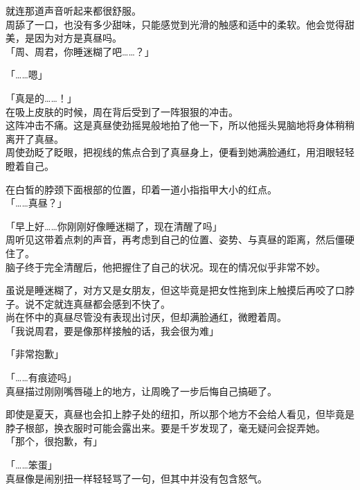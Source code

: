 就连那道声音听起来都很舒服。\\

周舔了一口，也没有多少甜味，只能感觉到光滑的触感和适中的柔软。他会觉得甜美，是因为对方是真昼吗。\\

「周、周君，你睡迷糊了吧……？」

「……嗯」

「真是的……！」\\

在吸上皮肤的时候，周在背后受到了一阵狠狠的冲击。\\

这阵冲击不痛。这是真昼使劲摇晃般地拍了他一下，所以他摇头晃脑地将身体稍稍离开了真昼。\\

周使劲眨了眨眼，把视线的焦点合到了真昼身上，便看到她满脸通红，用泪眼轻轻瞪着自己。

在白皙的脖颈下面根部的位置，印着一道小指指甲大小的红点。\\

「……真昼？」

「早上好……你刚刚好像睡迷糊了，现在清醒了吗」\\

周听见这带着点刺的声音，再考虑到自己的位置、姿势、与真昼的距离，然后僵硬住了。\\

脑子终于完全清醒后，他把握住了自己的状况。现在的情况似乎非常不妙。

虽说是睡迷糊了，对方又是女朋友，但这毕竟是把女性拖到床上触摸后再咬了口脖子。说不定就连真昼都会感到不快了。\\

尚在怀中的真昼尽管没有表现出讨厌，但却满脸通红，微瞪着周。\\

「我说周君，要是像那样接触的话，我会很为难」

「非常抱歉」

「……有痕迹吗」\\

真昼描过刚刚嘴唇碰上的地方，让周晚了一步后悔自己搞砸了。

即使是夏天，真昼也会扣上脖子处的纽扣，所以那个地方不会给人看见，但毕竟是脖子根部，换衣服时可能会露出来。要是千岁发现了，毫无疑问会捉弄她。\\

「那个，很抱歉，有」

「……笨蛋」\\

真昼像是闹别扭一样轻轻骂了一句，但其中并没有包含怒气。\\

